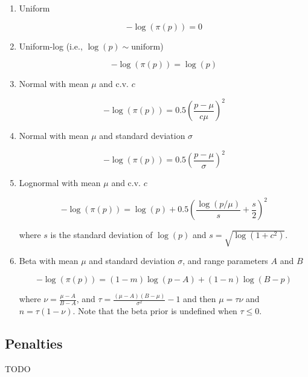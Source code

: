 \begin{enumerate}
\item{Uniform}

\begin{equation}
 - \log \left(\pi \left(p \right) \right) = 0
\end{equation}

\item{Uniform-log} (i.e., $\log(p) \sim \text{uniform}$)

\begin{equation}
 - \log \left(\pi \left(p \right) \right) = \log \left( p \right)
\end{equation}

\item{Normal with mean $\mu$ and c.v. $c$}

\begin{equation}
 - \log \left(\pi \left(p \right) \right) = 0.5\left(\frac{p - \mu}{c\mu} \right)^2 
\end{equation}

\item{Normal with mean $\mu$ and standard deviation $\sigma$}

\begin{equation}
 - \log \left(\pi \left(p \right) \right) = 0.5\left(\frac{p - \mu}
{\sigma }\right)^2
\end{equation}

\item{Lognormal with mean $\mu$ and c.v. $c$} 

\begin{equation}
 - \log \left(\pi \left(p \right) \right) = \log \left( p \right) + 0.5 \left( \frac{\log \left( p / \mu \right)}{s} + \frac{s}{2} \right)^2
\end{equation}

where $s$ is the standard deviation of $\log(p)$ and $s= \sqrt{\log \left(1+c^2 \right)}$.

\item{Beta with mean $\mu$ and standard deviation $\sigma$, and range parameters $A$ and $B$}

\begin{equation}
 - \log \left(\pi \left( p \right) \right) = \left( 1 - m \right) \log \left( p - A \right) + \left( 1 - n \right)\log \left( B - p \right)
\end{equation}

where $\nu  = \frac{\mu  - A}{B - A}$, and $\tau = \frac{\left(\mu -A \right)\left(B - \mu \right)}{\sigma ^2} - 1$ and then $\mu=\tau \nu$ and $n=\tau(1-\nu)$. Note that the beta prior is undefined when $\tau \leq 0$.

\end{enumerate}

\subsection{Penalties\label{sec:penalties}}

TODO
